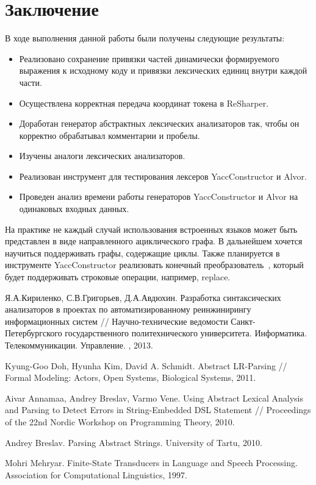 \section*{Заключение}
В ходе выполнения данной работы были получены следующие результаты:
\begin{itemize}
\item Реализовано сохранение привязки частей динамически формируемого выражения к исходному коду и привязки лексических единиц внутри каждой части.
\item Осуществлена корректная передача координат токена в ReSharper.
\item Доработан генератор абстрактных лексических анализаторов так, чтобы он корректно обрабатывал комментарии и пробелы.
\item Изучены аналоги лексических анализаторов.
\item Реализован инструмент для тестирования лексеров YaccConstructor и Alvor.
\item Проведен анализ времени работы генераторов YaccConstructor и Alvor на одинаковых входных данных.
\end{itemize}

На практике не каждый случай использования встроенных языков может быть представлен в виде направленного ациклического графа. 
В дальнейшем хочется научиться поддерживать графы, содержащие циклы. Также планируется в инструменте YaccConstructor реализовать 
конечный преобразователь~\cite{Mehryar}, который будет поддерживать строковые операции, например, replace.

\begin{thebibliography}{99}
Я.А.Кириленко, С.В.Григорьев, Д.А.Авдюхин.
Разработка синтаксических анализаторов в проектах по автоматизированному реинжинирингу информационных систем //
Научно-технические ведомости Санкт-Петербургского государственного политехнического университета. Информатика. Телекоммуникации. Управление.
, 2013.

Kyung-Goo Doh, Hyunha Kim, David A. Schmidt.
Abstract LR-Parsing // Formal Modeling: Actors, Open Systems, Biological Systems, 2011.

Aivar Annamaa, Andrey Breslav, Varmo Vene.
Using Abstract Lexical Analysis and Parsing to Detect Errors in String-Embedded DSL Statement //
Proceedings of the 22nd Nordic Workshop on Programming Theory, 2010.

Andrey Breslav. Parsing Abstract Strings. University of Tartu, 2010.

Mohri Mehryar. Finite-State Transducers in Language and Speech Processing. Association for Computational Linguistics, 
1997.
\end{thebibliography}
